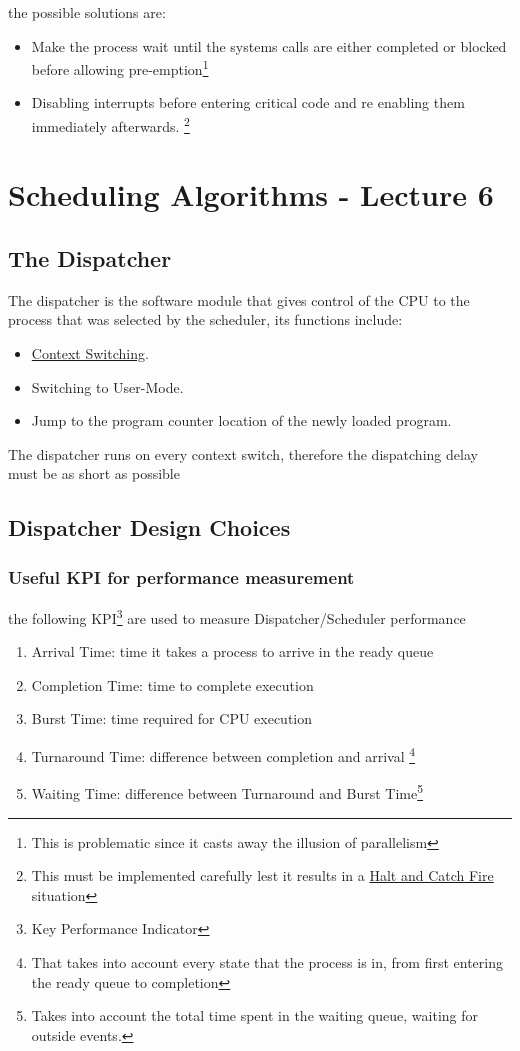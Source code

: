 \documentclass[openright, twoside]{report}
\theoremstyle{definition}
\theoremstyle{example}
\begin{document}
				the possible solutions are:
				\begin{itemize}
					\item Make the process wait until the systems calls are either completed or blocked before  
					allowing pre-emption\footnote{This is problematic since it casts away the illusion of parallelism}
					\item Disabling interrupts before entering critical code and re enabling 
					them immediately afterwards. \footnote{This must be implemented carefully
					lest it results in a \href{https://en.wikipedia.org/wiki/Halt_and_Catch_Fire_(computing)}{Halt and Catch Fire} situation}
				\end{itemize}
				
\chapter{Scheduling Algorithms - Lecture 6}
		\section{The Dispatcher}
			The dispatcher is the software module that gives control of the CPU to the 
			process that was selected by the scheduler, its functions include:
			\begin{itemize}
				\item \hyperref[ssec:context]{Context Switching}. 
				\item Switching to User-Mode.
				\item Jump to the program counter location of the newly loaded program.
			\end{itemize}

		The dispatcher runs on every context switch, therefore the dispatching delay
		must be as short as possible 
		\section{Dispatcher Design Choices}
			\subsection{Useful KPI for performance measurement}
				\label{ssec:KPI}
				the following KPI\footnote{Key Performance Indicator} are used to measure Dispatcher/Scheduler
				performance
				
				\begin{enumerate}
					\item Arrival Time: time it takes a process to arrive in the ready queue
					\item Completion Time: time to complete execution 
					\item Burst Time: time required for CPU execution  
					\item Turnaround Time: difference between completion and arrival
					\footnote{That takes into account every state that the process
					is in, from first entering the ready queue to completion}
					\item Waiting Time: difference between Turnaround and Burst Time\footnote{Takes into account
					the total time spent in the waiting queue, waiting for outside events.}
				\end{enumerate}
\end{document}
